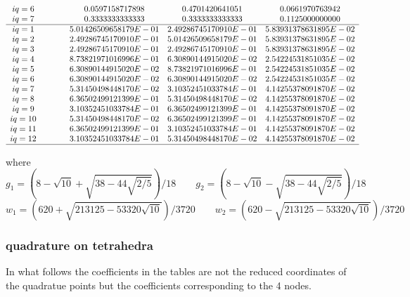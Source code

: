 {\[\begin{array}{ccccccc}
iq=6 &&&&0.0597158717898 &  0.4701420641051  &     0.0661970763942 \\
iq=7 &&&&0.3333333333333 &  0.3333333333333  &     0.1125000000000 \\
\hline
iq=1&&&& 5.01426509658179E-01&  2.49286745170910E-01 &   5.83931378631895E-02 \\ 
iq=2&&&& 2.49286745170910E-01&  5.01426509658179E-01 &   5.83931378631895E-02 \\ 
iq=3&&&& 2.49286745170910E-01&  2.49286745170910E-01 &   5.83931378631895E-02 \\ 
iq=4&&&& 8.73821971016996E-01&  6.30890144915020E-02 &   2.54224531851035E-02 \\ 
iq=5&&&& 6.30890144915020E-02&  8.73821971016996E-01 &   2.54224531851035E-02 \\ 
iq=6&&&& 6.30890144915020E-02&  6.30890144915020E-02 &   2.54224531851035E-02 \\ 
iq=7&&&& 5.31450498448170E-02&  3.10352451033784E-01 &   4.14255378091870E-02 \\ 
iq=8&&&& 6.36502499121399E-01&  5.31450498448170E-02 &   4.14255378091870E-02 \\ 
iq=9&&&& 3.10352451033784E-01&  6.36502499121399E-01 &   4.14255378091870E-02 \\ 
iq=10&&&& 5.31450498448170E-02&  6.36502499121399E-01 &   4.14255378091870E-02 \\ 
iq=11&&&& 6.36502499121399E-01&  3.10352451033784E-01 &   4.14255378091870E-02 \\ 
iq=12&&&& 3.10352451033784E-01&  5.31450498448170E-02 &   4.14255378091870E-02 \\ 
\hline
\end{array}
\]
}

where
\[ 
g_1 = \left(8-\sqrt{10} + \sqrt{38-44\sqrt{2/5}}\right)/18
\qquad
g_2 = \left(8-\sqrt{10} - \sqrt{38-44\sqrt{2/5}}\right)/18
\]
\[
w_1 = \left(620+\sqrt{213125-53320\sqrt{10}}\right)/3720
\qquad
w_2 = \left(620-\sqrt{213125-53320\sqrt{10}}\right)/3720
\]


      


\subsubsection{quadrature on tetrahedra}

\begin{remark}
In what follows the coefficients in the tables are not the reduced coordinates
of the quadratue points but the coefficients corresponding to the 4 nodes.
\end{remark}

